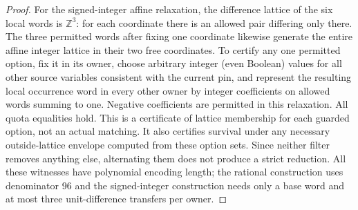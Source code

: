 \documentclass[11pt]{article}
\begin{document}
\begin{proof}
For the signed-integer affine relaxation, the difference lattice of the six local words is $\mathbb Z^3$: for each coordinate there is an allowed pair differing only there. The three permitted words after fixing one coordinate likewise generate the entire affine integer lattice in their two free coordinates. To certify any one permitted option, fix it in its owner, choose arbitrary integer (even Boolean) values for all other source variables consistent with the current pin, and represent the resulting local occurrence word in every other owner by integer coefficients on allowed words summing to one. Negative coefficients are permitted in this relaxation. All quota equalities hold. This is a certificate of lattice membership for each guarded option, not an actual matching. It also certifies survival under any necessary outside-lattice envelope computed from these option sets. Since neither filter removes anything else, alternating them does not produce a strict reduction. All these witnesses have polynomial encoding length; the rational construction uses denominator 96 and the signed-integer construction needs only a base word and at most three unit-difference transfers per owner.
\end{proof}
\end{document}
